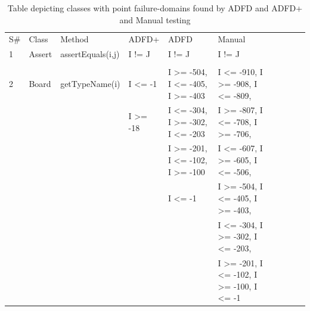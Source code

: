 \documentclass[runningheads,a4paper]{llncs}
\begin{document}
\begin{table}[h]
\caption{Table depicting classes with point failure-domains found by ADFD and ADFD+ and Manual testing}
\centering
{\renewcommand{\arraystretch}{1}
\begin{tabular}{llllllllll}

S\# & Class			& Method 					& ADFD+        				& ADFD     								& Manual																						\\ 

1	& Assert			& assertEquals(i,j)		&  	I != J								& I != J															&  I != J																	\\ 
	&                         &                                      & 										& 																&  			   															\\	
2	& Board			& getTypeName(i)		&  	I \textless= -1						& I \textgreater= -504, I \textless= -405, I \textgreater= -403		&  I \textless= -910, I \textgreater= -908, I \textless= -809,    				  \\ 
	&                         &                                      & 	I \textgreater= -18					& I \textless= -304, I \textgreater= -302, I \textless= -203			&  I \textgreater= -807, I \textless= -708, I \textgreater= -706, 				  \\	
	&                         &                                      & 										& I \textgreater= -201, I \textless= -102, I \textgreater= -100		&  I \textless= -607, I \textgreater= -605, I \textless= -506,		 		 \\
	&                         &                                      & 										& I \textless= -1													&  I \textgreater= -504, I \textless= -405, I \textgreater= -403,				  \\
	&                         &                                      & 										& 																&  I \textless= -304, I \textgreater= -302, I \textless= -203,				  \\
	&                         &                                      & 										& 																&  I \textgreater= -201, I \textless= -102, I \textgreater= -100, I \textless= -1 \\
	

\end{tabular}}
\end{table}
\end{document}
